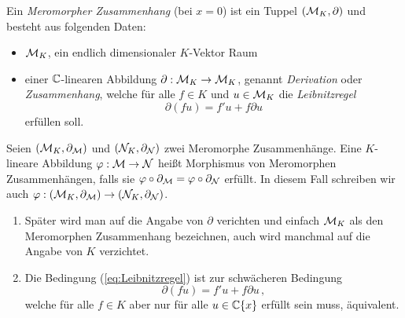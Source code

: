 \begin{defn} \label{def:merom-zush}
Ein \emph{Meromorpher Zusammenhang} (bei $x=0$) ist ein Tuppel
$(\mathcal{M}_K,\partial)$ und besteht aus folgenden Daten:
\begin{itemize}
\item $\mathcal{M}_K$, ein endlich dimensionaler $K$-Vektor Raum
\item einer $\mathbb{C}$-linearen Abbildung $\partial:\mathcal{M}_K\rightarrow \mathcal{M}_K$,
genannt \emph{Derivation} oder \emph{Zusammenhang}, welche für alle $f\in K$
und $u\in \mathcal{M}_K$ die
\emph{Leibnitzregel}
\begin{equation}\label{eq:Leibnitzregel}
\partial(fu)=f'u+f\partial u
\end{equation}
erfüllen soll.
\end{itemize}
\end{defn}

\begin{defn}
Seien $(\mathcal{M}_K,\partial_\mathcal{M})$ und $(\mathcal{N}_K,\partial_\mathcal{N})$ zwei Meromorphe
Zusammenhänge. Eine $K$-lineare Abbildung $\varphi:\mathcal{M}\rightarrow\mathcal{N}$ heißt
Morphismus von Meromorphen Zusammenhängen, falls sie
$\varphi\circ\partial_\mathcal{M}=\varphi\circ\partial_\mathcal{N}$ erfüllt. In diesem Fall schreiben
wir auch $\varphi:(\mathcal{M}_K,\partial_\mathcal{M})\rightarrow(\mathcal{N}_K,\partial_\mathcal{N})$.
\end{defn}

\begin{bem}
\begin{enumerate}
\item Später wird man auf die Angabe von $\partial$ verichten und einfach
$\mathcal{M}_K$ als den Meromorphen Zusammenhang bezeichnen, auch wird manchmal auf die
Angabe von $K$ verzichtet.
\item \cite[Rem 5.1.2.]{hotta2007d}
Die Bedingung (\ref{eq:Leibnitzregel}) ist zur schwächeren Bedingung
\[
\partial(fu)=f'u+f\partial u \,,
\]
welche für alle $f\in K$ aber nur für alle $u\in {\mathbb C \{x\}}$ erfüllt sein muss,
äquivalent.
\end{enumerate}
\end{bem}

